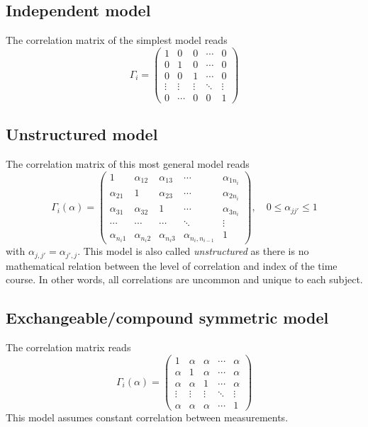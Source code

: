 \subsection*{Independent model}
The correlation matrix of the simplest model reads
\[
 \Gamma_i =
 \begin{pmatrix}
  	1 		& 0		 	& 0 			& \cdots 		& 0 \\
	0		& 1 			& 0		 	& \cdots 		& 0 \\
	0		& 0			& 1 			& \cdots 		& 0 \\
	\vdots 	& \vdots		& \vdots		& \ddots		& \vdots \\
	0		& \cdots		& 0			& 0			& 1 	
 \end{pmatrix}
\]


\subsection*{Unstructured model}
The correlation matrix of this most general model reads
\[
 \Gamma_i(\alpha) =
 \begin{pmatrix}
  1 			& \alpha_{12}  	& \alpha_{13} 	& \cdots 	& \alpha_{1n_i} \\
\alpha_{21}	& 1  			& \alpha_{23} 	& \cdots 	& \alpha_{2n_i} \\
\alpha_{31}	& \alpha_{32}	& 1 			& \cdots 	& \alpha_{3n_i} \\
\cdots		& \cdots		& \cdots		& \ddots	& \vdots \\
\alpha_{n_i 1}	& \alpha_{n_i 2}& \alpha_{n_i3}& \alpha_{n_i,n_{i-1}}	& 	1
 \end{pmatrix}, \quad 0 \le \alpha_{jj'} \le 1
\]
with $\alpha_{j,j'} = \alpha_{j',j}$. This model is also called \textit{unstructured} 
as there is no mathematical relation between the level of correlation and index 
of the time course. In other words, all correlations are uncommon and unique 
to each subject.

\subsection*{Exchangeable/compound symmetric model}
The correlation matrix reads
\[
 \Gamma_i(\alpha) =
 \begin{pmatrix}
  1 		& \alpha 	& \alpha 	& \cdots & \alpha \\
\alpha	& 1 		& \alpha	& \cdots & \alpha \\
\alpha	& \alpha 	& 1		& \cdots & \alpha \\
\vdots	& \vdots	& \vdots	& \ddots & \vdots \\
\alpha	& \alpha	& \alpha 	& \cdots &1
 \end{pmatrix}
\]
This model assumes constant correlation between measurements.

